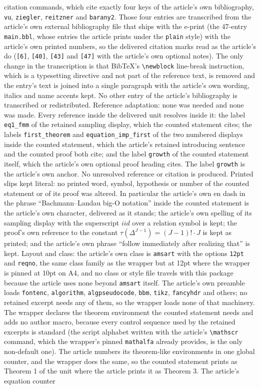 \documentclass[10pt,a4paper]{amsart}
\theoremstyle{plain}
\begin{document}
citation commands, which cite exactly four keys of the article's own bibliography, \texttt{vu}, \texttt{ziegler}, \texttt{reitzner} and \texttt{barany2}. Those four entries are transcribed from the article's own external bibliography file that ships with the e-print (the 47-entry \texttt{main.bbl}, whose entries the article prints under the \texttt{plain} style) with the article's own printed numbers, so the delivered citation marks read as the article's do (\texttt{[6]}, \texttt{[40]}, \texttt{[43]} and \texttt{[47]} with the article's own optional notes). The only change in the transcription is that BibTeX's \texttt{\textbackslash newblock} line-break instruction, which is a typesetting directive and not part of the reference text, is removed and the entry's text is joined into a single paragraph with the article's own wording, italics and name accents kept. No other entry of the article's bibliography is transcribed or redistributed. Reference adaptation: none was needed and none was made. Every reference inside the delivered unit resolves inside it: the label \texttt{eq1\_fmm} of the retained sampling display, which the counted statement cites; the labels \texttt{first\_theorem} and \texttt{equation\_imp\_first} of the two numbered displays inside the counted statement, which the article's retained introducing sentence and the counted proof both cite; and the label \texttt{growth} of the counted statement itself, which the article's own optional proof heading cites. The label \texttt{growth} is the article's own anchor. No unresolved reference or citation is produced. Printed slips kept literal: no printed word, symbol, hypothesis or number of the counted statement or of its proof was altered. In particular the article's own en dash in the phrase ``Bachmann--Landau big-O notation'' inside the counted statement is the article's own character, delivered as it stands; the article's own spelling of its sampling display with the superscript $iid$ over a relation symbol is kept; the proof's own reference to the constant $\tau(\Delta^{J-1})=(J-1)!\cdot J$ is kept as printed; and the article's own phrase ``follow immediately after realizing that'' is kept. Layout and class: the article's own class is \texttt{amsart} with the options \texttt{12pt} and \texttt{reqno}, the same class family as the wrapper but at 12pt where the wrapper is pinned at 10pt on A4, and no class or style file travels with this package because the article uses none beyond \texttt{amsart} itself. The article's own preamble loads \texttt{fontenc}, \texttt{algorithm}, \texttt{algpseudocode}, \texttt{bbm}, \texttt{tikz}, \texttt{fancyhdr} and others; no retained excerpt needs any of them, so the wrapper loads none of that machinery. The wrapper declares the theorem environment the counted statement needs and adds no author macro, because every control sequence used by the retained excerpts is standard (the script alphabet written with the article's \texttt{\textbackslash mathscr} command, which the wrapper's pinned \texttt{mathalfa} already provides, is the only non-default one). The article numbers its theorem-like environments in one global counter, and the wrapper does the same, so the counted statement prints as Theorem 1 of the unit where the article prints it as Theorem 3. The article's equation counter 
\end{document}
